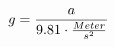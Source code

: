 \documentclass[preview]{standalone}
\begin{document}
\begin{align*}
\special{dvisvgm:raw <g id='unique000'>}g = \frac{a}{9.81 \cdot \frac{Meter}{s^{2}}}\special{dvisvgm:raw </g>}
\end{align*}
\end{document}
